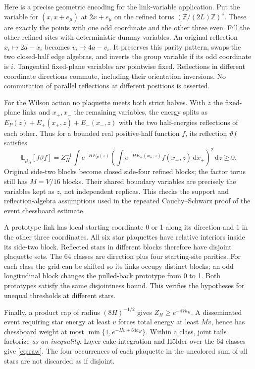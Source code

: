 \documentclass[11pt]{article}
\theoremstyle{definition}
\theoremstyle{remark}
\newcommand{\E}{\mathbb E}
\newcommand{\dd}{\,\mathrm d}
\begin{document}
Here is a precise geometric encoding for the link-variable application.
Put the variable for $(x,x+e_\mu)$ at $2x+e_\mu$ on the refined torus
$(\mathbb Z/(2L)\mathbb Z)^4$. These are exactly the points with one odd
coordinate and the other three even. Fill the other refined sites with
deterministic dummy variables. An original reflection
$x_i\mapsto2a-x_i$ becomes $v_i\mapsto4a-v_i$. It preserves this parity
pattern, swaps the two closed-half edge algebras, and inverts the group
variable if its odd coordinate is $i$. Tangential fixed-plane variables
are pointwise fixed. Reflections in different coordinate directions
commute, including their orientation inversions. No commutation of
parallel reflections at different positions is asserted.

For the Wilson action no plaquette meets both strict halves. With $z$
the fixed-plane links and $x_+,x_-$ the remaining variables, the energy
splits as $E_P(z)+E_+(x_+,z)+E_-(x_-,z)$ with the two half-energies
reflections of each other. Thus for a bounded real positive-half function
$f$, its reflection $\vartheta f$ satisfies
\begin{equation}
 \E_{\mu_H}[f\vartheta f]
 =Z_H^{-1}\int e^{-HE_P(z)}
   \left(\int e^{-HE_+(x_+,z)}f(x_+,z)\dd x_+\right)^2\dd z\ge0.
 \label{eq:rp}
\end{equation}
Original side-two blocks become closed side-four refined blocks; the
factor torus still has $M=V/16$ blocks. Their shared boundary variables
are precisely the variables kept as $z$, not independent replicas. This
checks the support and reflection-algebra assumptions used in the
repeated Cauchy--Schwarz proof of the event chessboard estimate.

A prototype link has local starting coordinate 0 or 1 along its direction
and 1 in the other three coordinates. All six star plaquettes have
relative interiors inside its side-two block. Reflected stars in
different blocks therefore have disjoint plaquette sets. The 64 classes
are direction plus four starting-site parities. For each class the grid
can be shifted so its links occupy distinct blocks; an odd longitudinal
block changes the pulled-back prototype from 0 to 1. Both prototypes
satisfy the same disjointness bound. This verifies the hypotheses for
unequal thresholds at different stars.

Finally, a product cap of radius $(8H)^{-1/2}$ gives
$Z_H\ge e^{-4Va_H}$. A disseminated event requiring star energy at least
$v$ forces total energy at least $Mv$, hence has chessboard weight at
most $\min\{1,e^{-Hv+64a_H}\}$. Within a class, joint tails factorize
\emph{as an inequality}. Layer-cake integration and H\"older over the
64 classes give \eqref{eq:raw}. The four occurrences of each plaquette
in the uncolored sum of all stars are not discarded as if disjoint.
\end{document}
